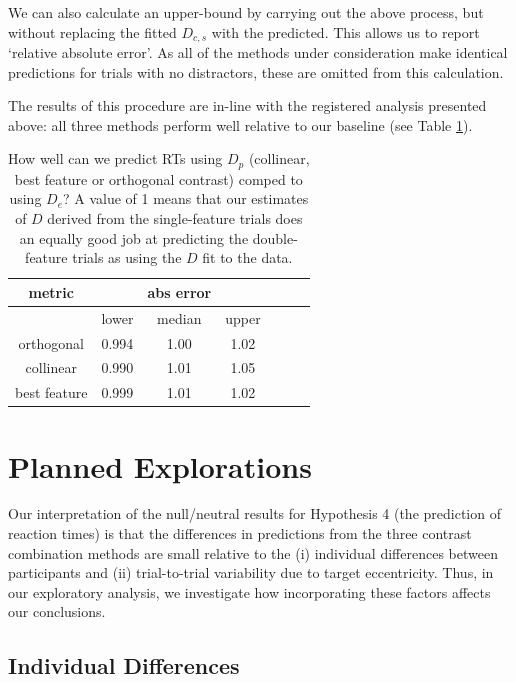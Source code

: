 \documentclass[preprint,12pt,authoryear]{elsarticle}
\begin{document}
We can also calculate an upper-bound by carrying out the above process, but without replacing the fitted $D_{c,s}$ with the predicted. This allows us to report `relative absolute error'. As all of the methods under consideration make identical predictions for trials with no distractors, these are omitted from this calculation. 

The results of this procedure are in-line with the registered analysis presented above: all three methods perform well relative to our baseline (see Table \ref{tab:new_pred_rt}).

\begin{table}[h]
\centering
\begin{tabular}{c|ccc|ccc} 
\hline
metric & & abs error & &   \\
 \hline
  & lower  & median & upper \\
 
orthogonal & 0.994 & 1.00 & 1.02 \\
collinear & 0.990 & 1.01 & 1.05\\ 
best feature  & 0.999 & 1.01 & 1.02 \\
 \end{tabular}
\caption{How well can we predict RTs using $D_p$ (collinear, best feature or orthogonal contrast) comped to using $D_e$? A value of 1 means that our estimates of $D$ derived from the single-feature trials does an equally good job at predicting the double-feature trials as using the $D$ fit to the data.}
\label{tab:new_pred_rt}
\end{table}


\section{Planned Explorations}

Our interpretation of the null/neutral results for Hypothesis 4 (the prediction of reaction times) is that the differences in predictions from the three contrast combination methods are small relative to the (i) individual differences between participants and (ii) trial-to-trial variability due to target eccentricity. Thus, in our exploratory analysis, we investigate how incorporating these factors affects our conclusions.

\subsection{Individual Differences}
\end{document}
